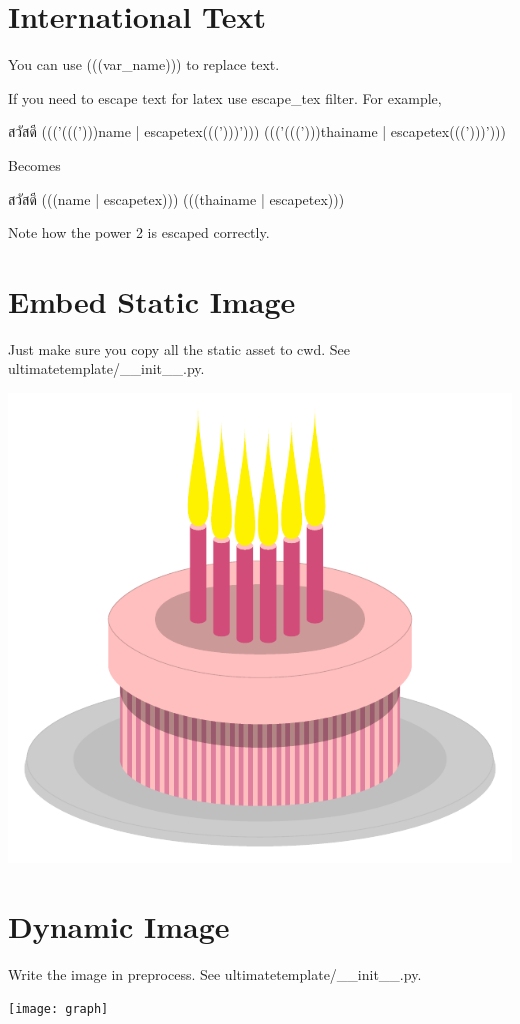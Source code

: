\documentclass[12pt]{article}
\begin{document}
\section{International Text}

You can use (((var_name))) to replace text.

If you need to escape text for latex use escape\_tex filter. For example,

สวัสดี ((('(((')))name | escapetex(((')))'))) ((('(((')))thainame | escapetex(((')))')))

Becomes

สวัสดี (((name | escapetex))) (((thainame | escapetex)))


Note how the power 2 is escaped correctly.

\section{Embed Static Image}

Just make sure you copy all the static asset to cwd. See ultimatetemplate/\_\_init\_\_.py.

\begin{center}
\includegraphics[width=0.7\linewidth]{assets/birthday-cake}
\end{center}

\section{Dynamic Image}

Write the image in preprocess. See ultimatetemplate/\_\_init\_\_.py.

\begin{center}
	\texttt{[image: graph]}
\end{center}
\end{document}
